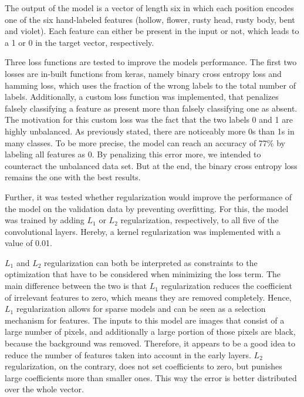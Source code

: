 The output of the model is a vector of length six in which each position encodes one of the six hand-labeled features (hollow, flower, rusty head, rusty body, bent and violet). Each feature can either be present in the input or not, which leads to a 1 or 0 in the target vector, respectively.

Three loss functions are tested to improve the models performance. The first two losses are in-built functions from keras, namely binary cross entropy loss and hamming loss, which uses the fraction of the wrong labels to the total number of labels. Additionally, a custom loss function was implemented, that penalizes falsely classifying a feature as present more than falsely classifying one as absent. The motivation for this custom loss was the fact that the two labels 0 and 1 are highly unbalanced. As previously stated, there are noticeably more 0s than 1s in many classes. To be more precise, the model can reach an accuracy of 77\% by labeling all features as 0. By penalizing this error more, we intended to counteract the unbalanced data set. But at the end, the binary cross entropy loss remains the one with the best results.

Further, it was tested whether regularization would improve the performance of the model on the validation data by preventing overfitting. For this, the model was trained by adding \(L_1\) or \(L_2\) regularization, respectively, to all five of the convolutional layers.  Hereby, a kernel regularization was implemented with a value of 0.01.

\(L_1\) and \(L_2\) regularization can both be interpreted as constraints to the optimization that have to be considered when minimizing the loss term. The main difference between the two is that \(L_1\) regularization reduces the coefficient of irrelevant features to zero, which means they are removed completely. Hence, \(L_1\) regularization allows for sparse models and can be seen as a selection mechanism for features. The inputs to this model are images that consist of a large number of pixels, and additionally a large portion of those pixels are black, because the background was removed. Therefore, it appears to be a good idea to reduce the number of features taken into account in the early layers. \(L_2\) regularization, on the contrary, does not set coefficients to zero, but punishes large coefficients more than smaller ones. This way the error is better distributed over the whole vector.

